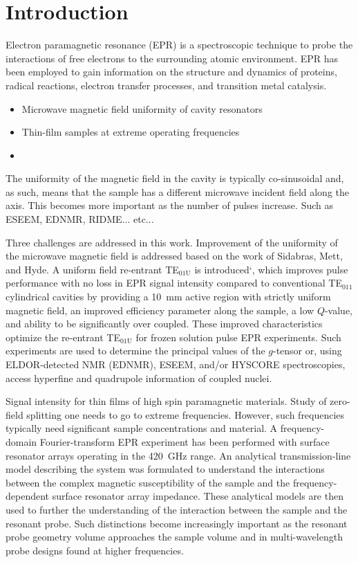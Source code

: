 \chapter[Introduction]{Introduction}

Electron paramagnetic resonance (EPR) is a spectroscopic technique to probe the interactions of free electrons to the surrounding atomic environment. EPR has been employed to gain information on the structure and dynamics of proteins, radical reactions, electron transfer processes, and transition metal catalysis. \cite{weil2007electron}

\begin{itemize}
    \item Microwave magnetic field uniformity of cavity resonators 
    \item Thin-film samples at extreme operating frequencies
    \item 
\end{itemize}

The uniformity of the magnetic field in the cavity is typically co-sinusoidal and, as such, means that the sample has a different microwave incident field along the axis. This becomes more important as the number of pulses increase. Such as ESEEM, EDNMR, RIDME... etc... 



Three challenges are addressed in this work. Improvement of the uniformity of the microwave magnetic field is addressed based on the work of Sidabras, Mett, and Hyde. A uniform field re-entrant TE$_{\text{01U}}$ is introduced`, which improves pulse performance with no loss in EPR signal intensity compared to conventional TE$_{011}$ cylindrical cavities by providing a 10~mm active region with strictly uniform magnetic field, an improved efficiency parameter along the sample, a low $Q$-value, and ability to be significantly over coupled. These improved characteristics optimize the re-entrant TE$_{\text{01U}}$ for frozen solution pulse EPR experiments. Such experiments are used to determine the principal values of the $g$-tensor or, using ELDOR-detected NMR (EDNMR), ESEEM, and/or HYSCORE spectroscopies, access hyperfine and quadrupole information of coupled nuclei. 

Signal intensity for thin films of high spin paramagnetic materials. Study of zero-field splitting one needs to go to extreme frequencies. However, such frequencies typically need significant sample concentrations and material. A frequency-domain Fourier-transform EPR experiment has been performed with surface resonator arrays operating in the 420~GHz range. An analytical transmission-line model describing the system was formulated to understand the interactions between the complex magnetic susceptibility of the sample and the frequency-dependent surface resonator array impedance. These analytical models are then used to further the understanding of the interaction between the sample and the resonant probe. Such distinctions become increasingly important as the resonant probe geometry volume approaches the sample volume and in multi-wavelength probe designs found at higher frequencies. 

